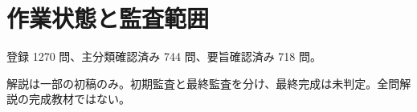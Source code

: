 \chapter{作業状態と監査範囲}
登録 1270 問、主分類確認済み 744 問、要旨確認済み 718 問。
\par 解説は一部の初稿のみ。初期監査と最終監査を分け、最終完成は未判定。全問解説の完成教材ではない。
